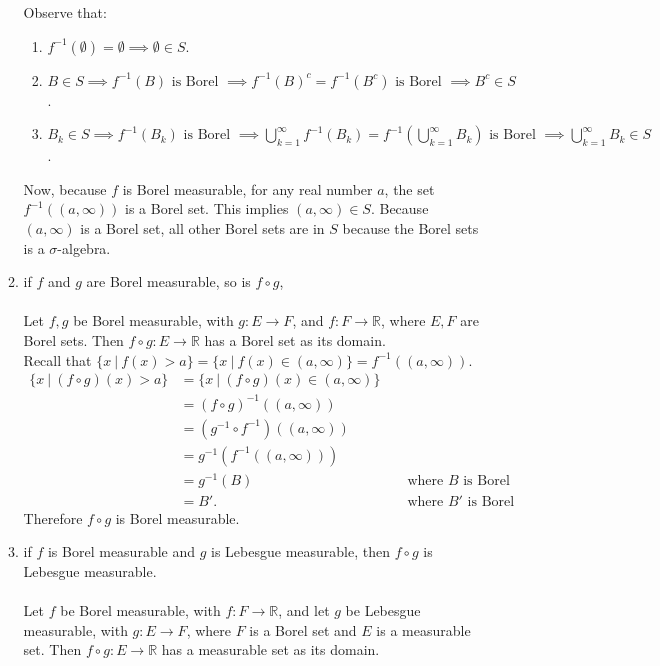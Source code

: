 \begin{enumerate}
\begin{enumerate}[label=(\roman*),align=left]
        Observe that:
        \begin{enumerate}[label=(\roman*),align=left]
            \item $f^{-1}(\emptyset)=\emptyset\implies\emptyset\in S$.
            \item $B\in S\implies f^{-1}(B)\text{ is Borel }\implies f^{-1}(B)^c=f^{-1}(B^c)\text{ is Borel }\implies B^c\in S$.
            \item $B_k\in S\implies f^{-1}(B_k)\text{ is Borel }\implies\bigcup_{k=1}^\infty f^{-1}(B_k)=f^{-1}(\bigcup_{k=1}^\infty B_k)\text{ is Borel }\implies \bigcup_{k=1}^\infty B_k\in S$.
        \end{enumerate}
        Now, because $f$ is Borel measurable, for any real number $a$, the set $f^{-1}((a,\infty))$ is a Borel set.
        This implies $(a,\infty)\in S$.
        Because $(a,\infty)$ is a Borel set, all other Borel sets are in $S$ because the Borel sets is a $\sigma$-algebra.
        \item if $f$ and $g$ are Borel measurable, so is $f\circ g$,\\
        \\Let $f,g$ be Borel measurable, with $g:E\to F$, and $f:F\to\mathbb{R}$, where $E,F$ are Borel sets. 
        Then $f\circ g:E\to\mathbb{R}$ has a Borel set as its domain.\\
        Recall that $\{x\ |\ f(x)>a\}=\{x\ |\ f(x)\in(a,\infty)\}=f^{-1}((a,\infty))$.
        \begin{align*}
            \{x\ |\ (f\circ g )(x)>a\}&=\{x\ |\ (f\circ g )(x)\in(a,\infty)\}\\
            &=(f\circ g )^{-1}((a,\infty))\\
            &=(g^{-1}\circ f^{-1})((a,\infty))\\
            &=g^{-1}(f^{-1}((a,\infty)))\\
            &=g^{-1}(B)&&\text{ where }B\text{ is Borel}\\
            &=B'.&&\text{ where }B'\text{ is Borel}
        \end{align*}
        Therefore $f\circ g$ is Borel measurable.
        \item if $f$ is Borel measurable and $g$ is Lebesgue measurable, then $f\circ g$ is Lebesgue measurable.\\
        \\Let $f$ be Borel measurable, with $f:F\to\mathbb{R}$, and let $g$ be Lebesgue measurable, with $g:E\to F$, where $F$ is a Borel set and $E$ is a measurable set. 
        Then $f\circ g:E\to\mathbb{R}$ has a measurable set as its domain.

\end{enumerate}
\end{enumerate}
